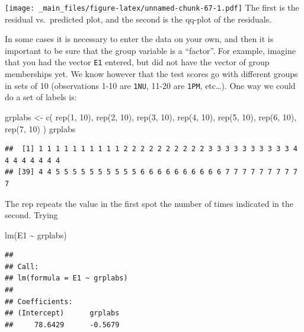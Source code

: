 \documentclass[
]{book}
\newenvironment{Shaded}{\begin{snugshade}}{\end{snugshade}}
\newcommand{\DecValTok}[1]{\textcolor[rgb]{0.00,0.00,0.81}{#1}}
\newcommand{\FunctionTok}[1]{\textcolor[rgb]{0.00,0.00,0.00}{#1}}
\newcommand{\NormalTok}[1]{#1}
\newcommand{\OtherTok}[1]{\textcolor[rgb]{0.56,0.35,0.01}{#1}}
\newcommand{\SpecialCharTok}[1]{\textcolor[rgb]{0.00,0.00,0.00}{#1}}
\begin{document}
\texttt{[image: \_main\_files/figure-latex/unnamed-chunk-67-1.pdf]}
The first is the residual vs.~predicted plot, and the second is the qq-plot of the residuals.

In some cases it is necessary to enter the data on your own, and then it is important to be sure that the group variable is a ``factor''. For example, imagine that you had the vector \texttt{E1} entered, but did not have the vector of group memberships yet. We know however that the test scores go with different groups in sets of 10 (observations 1-10 are \texttt{1NU}, 11-20 are \texttt{1PM}, etc\ldots). One way we could do a set of labels is:

\begin{Shaded}
\begin{Highlighting}[]
\NormalTok{grplabs }\OtherTok{\textless{}{-}} \FunctionTok{c}\NormalTok{(}
  \FunctionTok{rep}\NormalTok{(}\DecValTok{1}\NormalTok{, }\DecValTok{10}\NormalTok{), }\FunctionTok{rep}\NormalTok{(}\DecValTok{2}\NormalTok{, }\DecValTok{10}\NormalTok{), }\FunctionTok{rep}\NormalTok{(}\DecValTok{3}\NormalTok{, }\DecValTok{10}\NormalTok{),}
  \FunctionTok{rep}\NormalTok{(}\DecValTok{4}\NormalTok{, }\DecValTok{10}\NormalTok{), }\FunctionTok{rep}\NormalTok{(}\DecValTok{5}\NormalTok{, }\DecValTok{10}\NormalTok{), }\FunctionTok{rep}\NormalTok{(}\DecValTok{6}\NormalTok{, }\DecValTok{10}\NormalTok{), }\FunctionTok{rep}\NormalTok{(}\DecValTok{7}\NormalTok{, }\DecValTok{10}\NormalTok{)}
\NormalTok{)}
\NormalTok{grplabs}
\end{Highlighting}
\end{Shaded}

\begin{verbatim}
##  [1] 1 1 1 1 1 1 1 1 1 1 2 2 2 2 2 2 2 2 2 2 3 3 3 3 3 3 3 3 3 3 4 4 4 4 4 4 4 4
## [39] 4 4 5 5 5 5 5 5 5 5 5 5 6 6 6 6 6 6 6 6 6 6 7 7 7 7 7 7 7 7 7 7
\end{verbatim}

The rep repeats the value in the first spot the number of times indicated in the second. Trying

\begin{Shaded}
\begin{Highlighting}[]
\FunctionTok{lm}\NormalTok{(E1 }\SpecialCharTok{\textasciitilde{}}\NormalTok{ grplabs)}
\end{Highlighting}
\end{Shaded}

\begin{verbatim}
## 
## Call:
## lm(formula = E1 ~ grplabs)
## 
## Coefficients:
## (Intercept)      grplabs  
##     78.6429      -0.5679
\end{verbatim}
\end{document}
